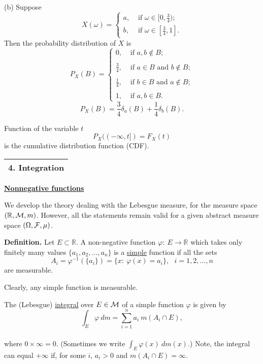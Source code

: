 \documentclass[a4paper,10pt]{article}
\def\RR{\mathbb{R}}
\newcommand{\1}[1]{\mathbf{1}_{\{#1\}}}
\begin{document}
(b) Suppose
  $$X(\omega)=\left\{\begin{array}{ll} a, & \mbox{ if } \omega\in [0,\frac{3}{4}); \\  b, & \mbox{ if } \omega\in[\frac{3}{4},1]. \end{array}\right. $$
Then the probability distribution of $X$ is
  $$P_X(B)=\left\{\begin{array}{ll}
0, & \mbox{ if } a,b\notin B;\\ \\ \frac{3}{4}, & \mbox{ if } a\in B \mbox{ and } b\notin B;\\ \\
\frac{1}{4}, & \mbox{ if } b\in B \mbox{ and } a\notin B;\\ \\ 1,& \mbox{ if } a,b\in B. \end{array}\right. $$
  $$P_X(B)=\frac{3}{4}\delta_a(B)+\frac{1}{4}\delta_b(B).$$

Function of the variable $t$
  $$P_X((-\infty,t])=F_X(t)$$
is the cumulative distribution function (CDF).
\vspace{5mm}

\begin{tabular}{|l|}
\hline {\LARGE\bf 4. Integration}\\
\hline\end{tabular}
\vspace{5mm}

\begin{center}\bf\underline{Nonnegative functions} \end{center}

We develop the theory dealing with the Lebesgue measure, for the measure space $(\RR,{\cal M},m)$. However, all the statements remain valid for a given abstract measure space $(\Omega,{\cal F},\mu)$.

{\bf Definition.} Let $E\subset \RR$. A non-negative function $\varphi:~E\to\RR$ which takes only finitely many values $\{a_1,a_2,\ldots,a_n\}$ is a \underline{simple} function if all the sets
  $$A_i=\varphi^{-1}(\{a_i\})=\{x:~\varphi(x)=a_i\},~~~i=1,2,\ldots,n$$
are measurable.

Clearly, any simple function is measurable.

The (Lebesgue) \underline{integral} over $E\in{\cal M}$ of a simple function $\varphi$ is given by
  $$\int_E\varphi~dm=\sum_{i=1}^n a_i~m(A_i\cap E),$$ \vspace{2cm} \\
where $0\times\infty=0$.
(Sometimes we write $\displaystyle \int_E\varphi(x)~dm(x)$.) Note, the integral can equal $+\infty$ if, for some $i$, $a_i>0$ and $m(A_i\cap E)=\infty$.
\vspace{3mm}
\end{document}
